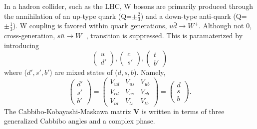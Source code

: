 In a hadron collider, such as the LHC, W bosons are primarily produced
through the annihilation of an up-type quark (Q=$\pm\frac{2}{3}$) 
and a down-type anti-quark (Q=$\pm\frac{1}{3}$). 
W coupling is favored within quark generations,
$u\bar{d}\rightarrow W^{+}$.
Although not 0, cross-generation, $s\bar{u}\rightarrow W^{-}$, transition is suppressed.
This is paramaterized by introducing 
\begin{equation}
\left(
    \begin{array}{c}
      u \\
      d' 
    \end{array}
  \right),
  \left(
    \begin{array}{c}
      c \\
      s' 
    \end{array}
  \right),
\left(
    \begin{array}{c}
      t \\
      b' 
    \end{array}
  \right)
\end{equation}
where ($d',s',b'$) are mixed states of ($d,s,b$). Namely,
\begin{equation}
\left(
    \begin{array}{c}
      d' \\
      s'  \\
      b'
    \end{array}
  \right)
  =
  \begin{pmatrix}
  V_{ud} & V_{us} & V_{ub}\\
  V_{cd} & V_{cs} & V_{cb}\\
  V_{td} & V_{ts} & V_{tb}
  \end{pmatrix}
  =
  \left(
    \begin{array}{c}
      d \\
      s  \\
      b
    \end{array}
  \right).
\end{equation}
The Cabbibo-Kobayashi-Maskawa matrix {\bf V} is written in terms 
of three generalized Cabbibo angles and a complex phase.
